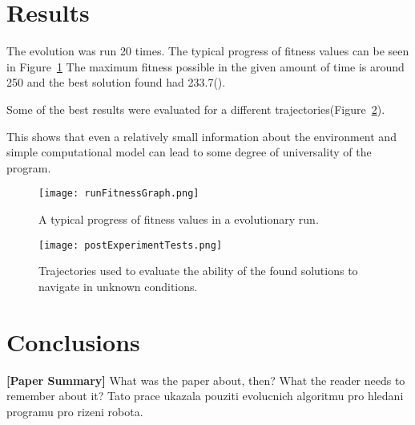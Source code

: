 \documentclass{ExcelAtFIT}
\begin{document}

\section{Results}
The evolution was run 20 times.
The typical progress of fitness values can be seen in Figure~\ref{fig:FitnessGraph}
The maximum fitness possible in the given amount of time is around 250 and the best solution found had 233.7().

Some of the best results were evaluated for a different trajectories(Figure~\ref{fig:PostExperimentTests}).

This shows that even a relatively small information about the environment and simple computational model can lead to some degree of universality of the program.

\begin{figure}[t]
	\centering
	{\texttt{[image: runFitnessGraph.png]}}
	\caption{
	A typical progress of fitness values in a evolutionary run.
	}
	\label{fig:FitnessGraph}
\end{figure}

\begin{figure}[t]
	\centering
	{\texttt{[image: postExperimentTests.png]}}
	\caption{
	Trajectories used to evaluate the ability of the found solutions to navigate in unknown conditions.
	}
	\label{fig:PostExperimentTests}
\end{figure}


\section{Conclusions}
\label{sec:Conclusions}

\textbf{[Paper Summary]} What was the paper about, then? What the reader needs to remember about it?
Tato prace ukazala pouziti evolucnich algoritmu pro hledani programu pro rizeni robota. 
\end{document}
